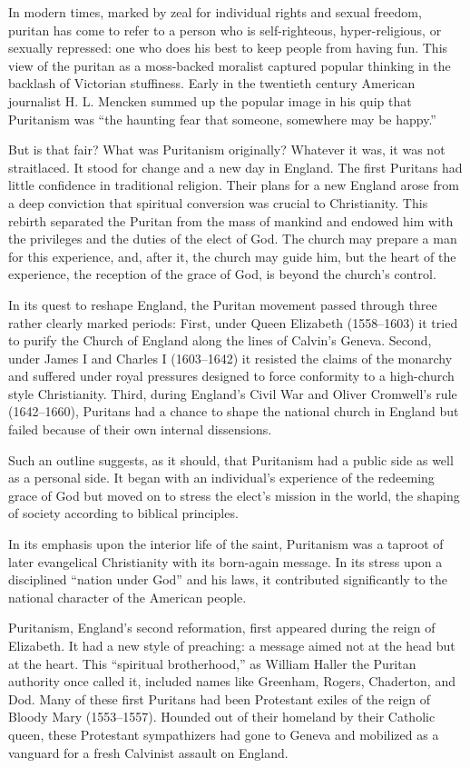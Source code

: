 In modern times, marked by zeal for individual rights and sexual freedom, puritan has come to refer
to a person who is self-righteous, hyper-religious, or sexually repressed: one who does his best to
keep people from having fun. This view of the puritan as a moss-backed moralist captured popular
thinking in the backlash of Victorian stuffiness. Early in the twentieth century American journalist
H. L. Mencken summed up the popular image in his quip that Puritanism was “the haunting fear that
someone, somewhere may be happy.”

But is that fair? What was Puritanism originally? Whatever it was, it was not straitlaced. It stood
for change and a new day in England. The first Puritans had little confidence in traditional
religion. Their plans for a new England arose from a deep conviction that spiritual conversion was
crucial to Christianity. This rebirth separated the Puritan from the mass of mankind and endowed him
with the privileges and the duties of the elect of God. The church may prepare a man for this
experience, and, after it, the church may guide him, but the heart of the experience, the reception
of the grace of God, is beyond the church’s control.

In its quest to reshape England, the Puritan movement passed through three rather clearly marked
periods: First, under Queen Elizabeth (1558–1603) it tried to purify the Church of England along the
lines of Calvin’s Geneva. Second, under James I and Charles I (1603–1642) it resisted the claims of
the monarchy and suffered under royal pressures designed to force conformity to a high-church style
Christianity. Third, during England’s Civil War and Oliver Cromwell’s rule (1642–1660), Puritans had
a chance to shape the national church in England but failed because of their own internal
dissensions.

Such an outline suggests, as it should, that Puritanism had a public side as well as a personal
side. It began with an individual’s experience of the redeeming grace of God but moved on to stress
the elect’s mission in the world, the shaping of society according to biblical principles.

In its emphasis upon the interior life of the saint, Puritanism was a taproot of later evangelical
Christianity with its born-again message. In its stress upon a disciplined “nation under God” and
his laws, it contributed significantly to the national character of the American people.

Puritanism, England’s second reformation, first appeared during the reign of Elizabeth. It had a new
style of preaching: a message aimed not at the head but at the heart. This “spiritual brotherhood,”
as William Haller the Puritan authority once called it, included names like Greenham, Rogers,
Chaderton, and Dod. Many of these first Puritans had been Protestant exiles of the reign of Bloody
Mary (1553–1557). Hounded out of their homeland by their Catholic queen, these Protestant
sympathizers had gone to Geneva and mobilized as a vanguard for a fresh Calvinist assault on
England.

